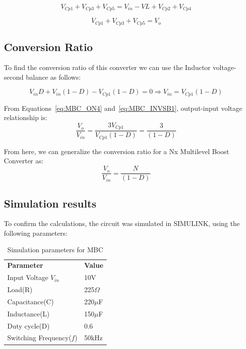 \begin{equation}
	V_{Cp1} + V_{Cp3} + V_{Cp5} = V_{in} - V{L} + V_{Cp2} + V_{Cp4}
	\label{eq:MBC_OFF3}
\end{equation}

\begin{equation}
	V_{Cp1} + V_{Cp3} + V_{Cp5} = V_o
	\label{eq:MBC_OFF4}
\end{equation}

\subsection{Conversion Ratio}

To find the conversion ratio of this converter we can use the Inductor voltage-second balance as follows:

\begin{equation}
	V_{in}D + V_{in}(1-D) - V_{Cp1}(1-D)= 0 
	\Rightarrow
	V_{in} = V_{Cp1}(1-D)
	\label{eq:MBC_INVSB1}
\end{equation}

From Equations~\ref{eq:MBC_ON4} and~\ref{eq:MBC_INVSB1}, output-input voltage relationship is:
\begin{equation}
	\frac{V_o}{V_{in}} = \frac{3V_{Cp1}}{V_{Cp1}(1-D)} = \frac{3}{(1-D)}
	\label{eq:MBC_INVSB2}
\end{equation}

From here, we can generalize the conversion ratio for a Nx Multilevel Boost Converter as:
\begin{equation}
	\frac{V_o}{V_{in}} = \frac{N}{(1-D)}
	\label{eq:MBC_INVSB3}
\end{equation}

\subsection{Simulation results}

To confirm the calculations, the circuit was simulated in SIMULINK, using the following parameters: 

\begin{table}[H]
\begin{center}
\caption {Simulation parameters for MBC} \label{tab:MBC} 
\begin{tabular}{|l|l|}
\cline{1-2}
\textbf{Parameter} & \textbf{Value}  \\ \cline{1-2}
Input Voltage $V_{in}$          &      10V   \\ \cline{1-2}
Load(R)   & 225$\Omega$           \\ \cline{1-2}
Capacitance(C)          &       220$\mu$F     \\ \cline{1-2}
Inductance(L)          &      150$\mu$F      \\ \cline{1-2}
Duty cycle(D)          &     0.6       \\ \cline{1-2}
Switching Frequency($f$)          &      50kHz      \\ \cline{1-2}
\end{tabular}
\end{center}
\end{table}

